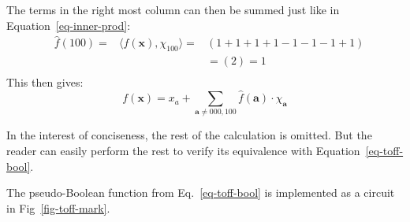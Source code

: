 \begin{example}
  
  The terms in the right most column can then be summed just like in Equation~\ref{eq-inner-prod}:
  \begin{align}
      &\hat{f}(100) = &\langle f(\mathbf{x}), \chi_{100} \rangle = &( 1 + 1 + 1 + 1 - 1 - 1 - 1 + 1) \\\nonumber
      &&& = ( 2 ) = 1\nonumber\\\nonumber
  \end{align}
  This then gives:
  \begin{equation}
    f(\mathbf{x}) = x_a + \sum_{\mathbf{a} \neq 000,100} \hat{f}(\mathbf{a}) \cdot \chi_{\mathbf{a}}
  \end{equation}

  In the interest of conciseness, the rest of the calculation is omitted. But the reader can easily perform the
  rest to verify its equivalence with Equation~\ref{eq-toff-bool}.
\end{example}

The pseudo-Boolean function from Eq.~\ref{eq-toff-bool} is implemented as a circuit in Fig~\ref{fig-toff-mark}.
